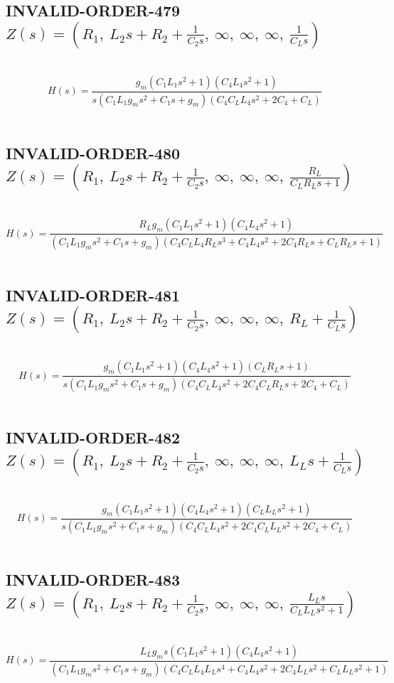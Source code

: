 \documentclass{article}
\begin{document}
\subsection{INVALID-ORDER-479 $Z(s) = \left( R_{1}, \  L_{2} s + R_{2} + \frac{1}{C_{2} s}, \  \infty, \  \infty, \  \infty, \  \frac{1}{C_{L} s}\right)$ } \ 
\textbf{\[H(s) = \frac{g_{m} \left(C_{1} L_{1} s^{2} + 1\right) \left(C_{4} L_{4} s^{2} + 1\right)}{s \left(C_{1} L_{1} g_{m} s^{2} + C_{1} s + g_{m}\right) \left(C_{4} C_{L} L_{4} s^{2} + 2 C_{4} + C_{L}\right)}\] } \ 
\subsection{INVALID-ORDER-480 $Z(s) = \left( R_{1}, \  L_{2} s + R_{2} + \frac{1}{C_{2} s}, \  \infty, \  \infty, \  \infty, \  \frac{R_{L}}{C_{L} R_{L} s + 1}\right)$ } \ 
\textbf{\[H(s) = \frac{R_{L} g_{m} \left(C_{1} L_{1} s^{2} + 1\right) \left(C_{4} L_{4} s^{2} + 1\right)}{\left(C_{1} L_{1} g_{m} s^{2} + C_{1} s + g_{m}\right) \left(C_{4} C_{L} L_{4} R_{L} s^{3} + C_{4} L_{4} s^{2} + 2 C_{4} R_{L} s + C_{L} R_{L} s + 1\right)}\] } \ 
\subsection{INVALID-ORDER-481 $Z(s) = \left( R_{1}, \  L_{2} s + R_{2} + \frac{1}{C_{2} s}, \  \infty, \  \infty, \  \infty, \  R_{L} + \frac{1}{C_{L} s}\right)$ } \ 
\textbf{\[H(s) = \frac{g_{m} \left(C_{1} L_{1} s^{2} + 1\right) \left(C_{4} L_{4} s^{2} + 1\right) \left(C_{L} R_{L} s + 1\right)}{s \left(C_{1} L_{1} g_{m} s^{2} + C_{1} s + g_{m}\right) \left(C_{4} C_{L} L_{4} s^{2} + 2 C_{4} C_{L} R_{L} s + 2 C_{4} + C_{L}\right)}\] } \ 
\subsection{INVALID-ORDER-482 $Z(s) = \left( R_{1}, \  L_{2} s + R_{2} + \frac{1}{C_{2} s}, \  \infty, \  \infty, \  \infty, \  L_{L} s + \frac{1}{C_{L} s}\right)$ } \ 
\textbf{\[H(s) = \frac{g_{m} \left(C_{1} L_{1} s^{2} + 1\right) \left(C_{4} L_{4} s^{2} + 1\right) \left(C_{L} L_{L} s^{2} + 1\right)}{s \left(C_{1} L_{1} g_{m} s^{2} + C_{1} s + g_{m}\right) \left(C_{4} C_{L} L_{4} s^{2} + 2 C_{4} C_{L} L_{L} s^{2} + 2 C_{4} + C_{L}\right)}\] } \ 
\subsection{INVALID-ORDER-483 $Z(s) = \left( R_{1}, \  L_{2} s + R_{2} + \frac{1}{C_{2} s}, \  \infty, \  \infty, \  \infty, \  \frac{L_{L} s}{C_{L} L_{L} s^{2} + 1}\right)$ } \ 
\textbf{\[H(s) = \frac{L_{L} g_{m} s \left(C_{1} L_{1} s^{2} + 1\right) \left(C_{4} L_{4} s^{2} + 1\right)}{\left(C_{1} L_{1} g_{m} s^{2} + C_{1} s + g_{m}\right) \left(C_{4} C_{L} L_{4} L_{L} s^{4} + C_{4} L_{4} s^{2} + 2 C_{4} L_{L} s^{2} + C_{L} L_{L} s^{2} + 1\right)}\] } \ 
\end{document}
